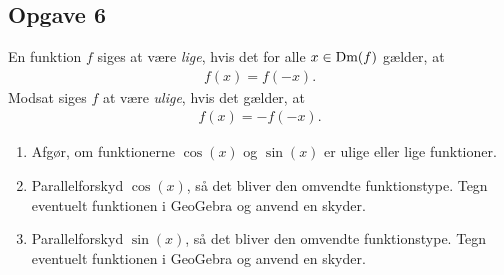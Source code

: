 \begin{center}
\end{center}

\subsection*{Opgave 6}
En funktion $f$ siges at være \textit{lige}, hvis det for alle $x \in \textnormal{Dm}(f)$ gælder, at
\begin{align*}
	f(x) = f(-x).
\end{align*}
Modsat siges $f$ at være \textit{ulige}, hvis det gælder, at
\begin{align*}
	f(x) = -f(-x).
\end{align*}
\begin{enumerate}[label=\roman*)]
	\item Afgør, om funktionerne $\cos(x)$ og $\sin(x)$ er ulige eller lige funktioner. 
	\item Parallelforskyd $\cos(x)$, så det bliver den omvendte funktionstype. Tegn eventuelt funktionen i 
	GeoGebra og anvend en skyder.
	\item Parallelforskyd $\sin(x)$, så det bliver den omvendte funktionstype. Tegn eventuelt funktionen i 
	GeoGebra og anvend en skyder.
\end{enumerate}
